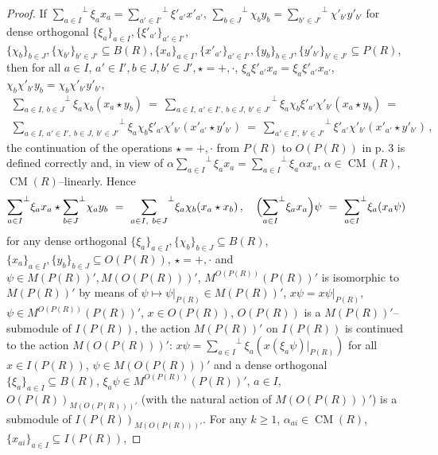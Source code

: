 \documentclass[a4paper,11pt]{article}
\DeclareMathOperator{\CM}{CM}
\begin{document}
\begin{proof}
If ${{\sum\limits_{a\in I}}^{\perp} \xi_a x_a=
{\sum\limits_{a'\in I'}}^{\perp} \xi'_{a'} x'_{a'}}$, 
${{\sum\limits_{b\in J}}^{\perp} \chi_b y_b=
{\sum\limits_{b'\in J'}}^{\perp} \chi'_{b'} y'_{b'}}$ for dense orthogonal 
${\{\xi_a\}_{a\in I}, \{\xi'_{a'}\}_{a'\in I'}}$, 
${\{\chi_b\}_{b\in J}, \{\chi_{b'}\}_{b'\in J'}\subseteq B(R), 
\{x_a\}_{a\in I}, \{x'_{a'}\}_{a'\in I'}, \{y_b\}_{b\in J}, 
\{y'_{b'}\}_{b'\in J'}\subseteq P(R)}$, then for all 
${a\in I}$, ${a'\in I', b\in J, b'\in J', \star=+, \cdot}$, 
${\xi_a \xi'_{a'} x_a=\xi_a \xi'_{a'} x_{a'}}$, 
${\chi_b \chi'_{b'} y_b=\chi_b \chi'_{b'} y'_{b'}}$, 
\begin{multline*}
{\sum_{a\in I,\ b\in J}}^{\perp} \xi_a \chi_b (x_a\star y_b) 
\ =\ 
{\sum_{a\in I,\ a'\in I',\ b\in J,\ b'\in J'}}^{\perp}
\xi_a \chi_b \xi'_{a'} \chi'_{b'} (x_a\star y_b)\ =
\\ 
{\sum_{a\in I,\ a'\in I',\ b\in J,\ b'\in J'}}^{\perp} 
\xi_a \chi_b \xi'_{a'} \chi'_{b'} (x'_{a'}\star y'_{b'})\ =\ 
{\sum_{a'\in I',\ b'\in J'}}^{\perp} \xi'_{a'} \chi'_{b'} 
(x'_{a'}\star y'_{b'})\,,
\end{multline*}
the continuation of the operations ${\star=+, \cdot}$ from $P(R)$ to $O(P(R))$ 
in p. 3 is defined correctly and, in view of 
${\alpha {\sum\limits_{a\in I}}^{\perp} \xi_a x_a=
{\sum\limits_{a\in I}}^{\perp} \xi_a \alpha x_a}$, ${\alpha\in \CM(R)}$, 
$\CM(R)$--linearly. Hence 
\[
{\sum_{a\in I}}^{\perp} \xi_a x_a\star {\sum_{b\in J}}^{\perp} \chi_a y_b\ =\ 
{\sum_{a\in I,\ b\in J}}^{\perp} \xi_a \chi_b (x_a\star x_b)\,,\quad 
\Bigl({\sum_{a\in I}}^{\perp} \xi_a x_a\Bigr) \psi\ =\ 
{\sum_{a\in I}}^{\perp} \xi_a (x_a \psi)
\]
for any dense orthogonal ${\{\xi_a\}_{a\in I}, \{\chi_b\}_{b\in J}
\subseteq B(R)}$, ${\{x_a\}_{a\in I}, \{y_b\}_{b\in J}\subseteq O(P(R))}$, 
${\star=+, \cdot}$ and ${\psi\in M(P(R))', M(O(P(R)))'}$, 
$M^{O(P(R))}(P(R))'$ is isomorphic to $M(P(R))'$ by means of 
${\psi\longmapsto \psi|_{P(R)}\in M(P(R))'}$, ${x \psi=x \psi|_{P(R)}}$, 
${\psi\in M^{O(P(R))}(P(R))'}$, ${x\in O(P(R))}$, 
$O(P(R))$ is a $M(P(R))'$--submodule of $I(P(R))$, the action $M(P(R))'$ on 
$I(P(R))$ is continued to the action $M(O(P(R)))'$:  
${x \psi={\sum\limits_{a\in I}}^{\perp} \xi_a (x (\xi_a \psi)|_{P(R)})}$ 
for all ${x\in I(P(R))}$, ${\psi\in M(O(P(R)))'}$ and a dense orthogonal 
${\{\xi_a\}_{a\in I}\subseteq B(R)}$, 
${\xi_a \psi\in M^{O(P(R))}(P(R))'}$, ${a\in I}$, 
$O(P(R))_{M(O(P(R)))'}$ (with the natural action of $M(O(P(R)))'$) is a 
submodule of $I(P(R))_{M(O(P(R)))'}$. For any ${k\geq 1}$, 
${\alpha_{a i}\in \CM(R)}$, ${\{x_{a i}\}_{a\in I}\subseteq I(P(R))}$, 

\end{proof}
\end{document}
